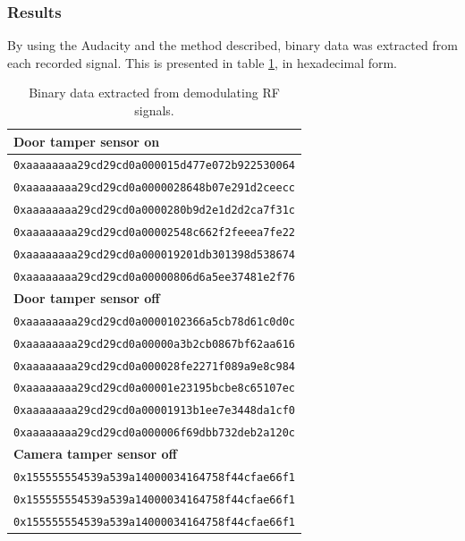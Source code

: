 \subsubsection{Results}
By using the Audacity and the method described, binary data was extracted from each recorded signal. This is presented in table \ref{tb:demodulated-data}, in hexadecimal form.
\begin{table}[!ht]
    \centering
    \begin{tabularx}{\textwidth}{l}
        \hline
        \textbf{Door tamper sensor on} \\ \hline
        \texttt{0xaaaaaaaa29cd29cd0a000015d477e072b922530064} \\
        \texttt{0xaaaaaaaa29cd29cd0a0000028648b07e291d2ceecc} \\
        \texttt{0xaaaaaaaa29cd29cd0a0000280b9d2e1d2d2ca7f31c} \\
        \texttt{0xaaaaaaaa29cd29cd0a00002548c662f2feeea7fe22} \\
        \texttt{0xaaaaaaaa29cd29cd0a000019201db301398d538674} \\
        \texttt{0xaaaaaaaa29cd29cd0a00000806d6a5ee37481e2f76} \\
        \hline
        
        \textbf{Door tamper sensor off} \\ \hline
        \texttt{0xaaaaaaaa29cd29cd0a0000102366a5cb78d61c0d0c} \\
        \texttt{0xaaaaaaaa29cd29cd0a00000a3b2cb0867bf62aa616} \\
        \texttt{0xaaaaaaaa29cd29cd0a000028fe2271f089a9e8c984} \\
        \texttt{0xaaaaaaaa29cd29cd0a00001e23195bcbe8c65107ec} \\
        \texttt{0xaaaaaaaa29cd29cd0a00001913b1ee7e3448da1cf0} \\
        \texttt{0xaaaaaaaa29cd29cd0a000006f69dbb732deb2a120c} \\
        \hline
        
        \textbf{Camera tamper sensor off} \\ \hline
        \texttt{0x155555554539a539a14000034164758f44cfae66f1} \\
        \texttt{0x155555554539a539a14000034164758f44cfae66f1} \\
        \texttt{0x155555554539a539a14000034164758f44cfae66f1} \\
        \hline
    \end{tabularx}
    \caption{Binary data extracted from demodulating RF signals.}
    \label{tb:demodulated-data}
\end{table}

